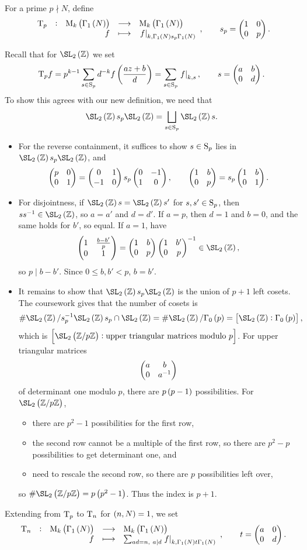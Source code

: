 \begin{definition}
For a prime $ p \nmid N $, define
$$ \function[\T_p]{\M_k\br{\Gamma_1\br{N}}}{\M_k\br{\Gamma_1\br{N}}}{f}{\eval{f}_{k, \Gamma_1\br{N}s_p\Gamma_1\br{N}}}, \qquad s_p = \twobytwo{1}{0}{0}{p}. $$
\end{definition}

Recall that for $ \SL_2\br{\ZZ} $ we set
$$ \T_pf = p^{k - 1}\sum_{s \in \S_p} d^{-k}f\br{\dfrac{az + b}{d}} = \sum_{s \in \S_p} \eval{f}_{k, s}, \qquad s = \twobytwo{a}{b}{0}{d}. $$
To show this agrees with our new definition, we need that
$$ \SL_2\br{\ZZ}s_p\SL_2\br{\ZZ} = \bigsqcup_{s \in \S_p} \SL_2\br{\ZZ}s. $$
\begin{itemize}
\item For the reverse containment, it suffices to show $ s \in \S_p $ lies in $ \SL_2\br{\ZZ}s_p\SL_2\br{\ZZ} $, and
$$ \twobytwo{p}{0}{0}{1} = \twobytwo{0}{1}{-1}{0}s_p\twobytwo{0}{-1}{1}{0}, \qquad \twobytwo{1}{b}{0}{p} = s_p\twobytwo{1}{b}{0}{1}. $$
\item For disjointness, if $ \SL_2\br{\ZZ}s = \SL_2\br{\ZZ}s' $ for $ s, s' \in \S_p $, then $ ss^{-1} \in \SL_2\br{\ZZ} $, so $ a = a' $ and $ d = d' $. If $ a = p $, then $ d = 1 $ and $ b = 0 $, and the same holds for $ b' $, so equal. If $ a = 1 $, have
$$ \twobytwo{1}{\tfrac{b - b'}{p}}{0}{1} = \twobytwo{1}{b}{0}{p}\twobytwo{1}{b'}{0}{p}^{-1} \in \SL_2\br{\ZZ}, $$
so $ p \mid b - b' $. Since $ 0 \le b, b' < p $, $ b = b' $.

\pagebreak

\item It remains to show that $ \SL_2\br{\ZZ}s_p\SL_2\br{\ZZ} $ is the union of $ p + 1 $ left cosets. The coursework gives that the number of cosets is
$$ \#\SL_2\br{\ZZ} / s_p^{-1}\SL_2\br{\ZZ}s_p \cap \SL_2\br{\ZZ} = \#\SL_2\br{\ZZ} / \Gamma_0\br{p} = \sbr{\SL_2\br{\ZZ} : \Gamma_0\br{p}}, $$
which is $ \sbr{\SL_2\br{\ZZ / p\ZZ} : \text{upper triangular matrices modulo} \ p} $. For upper triangular matrices
$$ \twobytwo{a}{b}{0}{a^{-1}} $$
of determinant one modulo $ p $, there are $ p\br{p - 1} $ possibilities. For $ \SL_2\br{\ZZ / p\ZZ} $,
\begin{itemize}
\item there are $ p^2 - 1 $ possibilities for the first row,
\item the second row cannot be a multiple of the first row, so there are $ p^2 - p $ possibilities to get determinant one, and
\item need to rescale the second row, so there are $ p $ possibilities left over,
\end{itemize}
so $ \#\SL_2\br{\ZZ / p\ZZ} = p\br{p^2 - 1} $. Thus the index is $ p + 1 $.
\end{itemize}
Extending from $ \T_p $ to $ \T_n $ for $ \br{n, N} = 1 $, we set
$$ \function[\T_n]{\M_k\br{\Gamma_1\br{N}}}{\M_k\br{\Gamma_1\br{N}}}{f}{\sum_{ad = n, \ a \mid d} \eval{f}_{k, \Gamma_1\br{N}t\Gamma_1\br{N}}}, \qquad t = \twobytwo{a}{0}{0}{d}. $$

